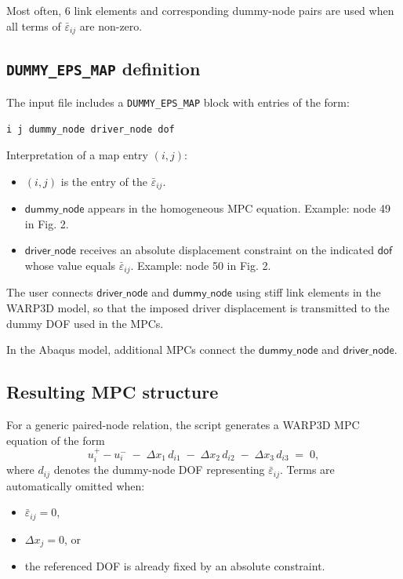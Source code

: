 \documentclass[11pt]{article}
\newcommand{\hv} {\mathsf}   %
\begin{document}
Most often, 6 link elements and corresponding dummy-node pairs are used when all 
terms of $\bar \varepsilon_{ij}$ are non-zero.

\subsection{\texttt{DUMMY\_EPS\_MAP} definition}
The input file includes a \texttt{DUMMY\_EPS\_MAP} block with entries of the form:
\begin{center}
\texttt{i j dummy\_node driver\_node dof}
\end{center}
Interpretation of a map entry $(i,j)$:
\begin{itemize}
\item $(i,j)$ is the entry of the $\bar \varepsilon_{ij}$.
\item $\hv {dummy\_node}$ appears in the homogeneous MPC equation. Example: 
node 49 in Fig. 2.
\item $\hv{driver\_node}$ receives an absolute displacement constraint
on the indicated $\hv{dof}$  whose value equals $\bar{\varepsilon}_{ij}$.
Example: node 50 in Fig. 2.
\end{itemize}
The user connects $\hv{driver\_node}$ and $\hv{dummy\_node}$ using stiff link elements in the WARP3D model,
so that the imposed driver displacement is transmitted to the dummy DOF used in the MPCs.

In the Abaqus model, additional MPCs connect 
the $\hv {dummy\_node}$ and  $\hv{driver\_node}$.


\subsection{Resulting MPC structure}
For a generic paired-node relation, the script generates a WARP3D MPC equation of the form
\begin{equation}
u_i^{+}-u_i^{-} \;-\; \Delta x_1\,d_{i1} \;-\; \Delta x_2\,d_{i2} \;-\; \Delta x_3\,d_{i3} \;=\; 0,
\end{equation}
where $d_{ij}$ denotes the dummy-node DOF representing $\bar{\varepsilon}_{ij}$.
Terms are automatically omitted when:
\begin{itemize}
\item $\bar{\varepsilon}_{ij}=0$,
\item $\Delta x_j=0$, or
\item the referenced DOF is already fixed by an absolute constraint.
\end{itemize}
\end{document}

